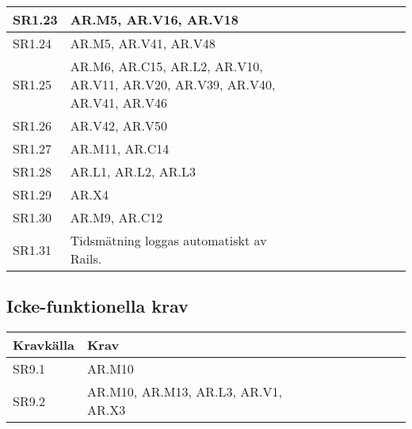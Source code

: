 \documentclass[a4paper, twoside, 11pt, titlepage]{article}
\begin{document}
\begin {table} [ht]
\begin{tabular} {  p{5cm} p{2cm} p{2cm} p{2cm} p{2cm} p{2cm} p{2cm} p{2cm} p{2cm} p{2cm} p{2cm} }
		\hline
		{SR1.23} & {AR.M5, AR.V16, AR.V18} \\
		\hline
		{SR1.24} & {AR.M5, AR.V41, AR.V48} \\
		\hline
		{SR1.25} & {AR.M6, AR.C15, AR.L2, AR.V10, AR.V11, AR.V20, AR.V39, AR.V40, AR.V41, AR.V46} \\
		\hline
		{SR1.26} & {AR.V42, AR.V50} \\
		\hline
		{SR1.27} & {AR.M11, AR.C14} \\
		\hline
		{SR1.28} & {AR.L1, AR.L2, AR.L3} \\
		\hline
		{SR1.29} & {AR.X4} \\
		\hline
		{SR1.30} & {AR.M9, AR.C12} \\
		\hline
		{SR1.31} & {Tidsmätning loggas automatiskt av Rails.} \\
		\hline
	\end{tabular} \end{table} \FloatBarrier


	\subsection{Icke-funktionella krav}


	\begin {table} [ht] \begin{tabular} {  p{5cm} p{2cm} p{2cm} p{2cm} p{2cm} p{2cm} p{2cm} p{2cm} p{2cm} p{2cm} p{2cm} }
		\hline
		{Kravkälla} & {Krav} \\
		\hline
		{SR9.1} & {AR.M10} \\
		\hline
		{SR9.2} & {AR.M10, AR.M13, AR.L3, AR.V1, AR.X3} \\
		\hline
	\end{tabular} \end{table} \FloatBarrier


\clearpage
	\appendix
\end{document}

